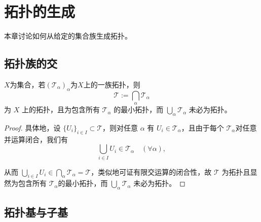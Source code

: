 \documentclass[lang=cn,a4paper,newtx,figureplace=section,tableplace=section]{elegantbook}
\begin{document}
\chapter{拓扑的生成}

本章讨论如何从给定的集合族生成拓扑。

\section{拓扑族的交}

\begin{proposition}
    $X$为集合，若$(\mathcal{T}_{\alpha})_{\alpha}$为$X$上的一族拓扑，则
\begin{equation}
\mathcal{T}:=\bigcap_{\alpha}\mathcal{T}_{\alpha}
\end{equation}
为 \(X\) 上的拓扑，且为包含所有 \(\mathcal{T}_{\alpha}\) 的最小拓扑，而 \(\bigcup_{\alpha}\mathcal{T}_{\alpha}\) 未必为拓扑。
\end{proposition}
\begin{proof}
具体地，设 $\{U_i\}_{i\in I}\subset\mathcal{T}$，则对任意 $\alpha$ 有 $U_i\in\mathcal{T}_{\alpha}$，且由于每个 $\mathcal{T}_{\alpha} $对任意并运算闭合，我们有
\begin{equation}
\bigcup_{i\in I}U_i\in\mathcal{T}_\alpha\quad(\forall\alpha),
\end{equation}

从而 $\bigcup_{i\in I}U_i\in\bigcap_{\alpha}\mathcal{T}_{\alpha}=\mathcal{T}$，类似地可证有限交运算的闭合性，故 $\mathcal{T}$ 为拓扑且显然为包含所有 $\mathcal{T}_{\alpha} $的最小拓扑，而 $\bigcup_{\alpha}\mathcal{T}_{\alpha}$ 未必为拓扑。
\end{proof}

\section{拓扑基与子基}
\end{document}
